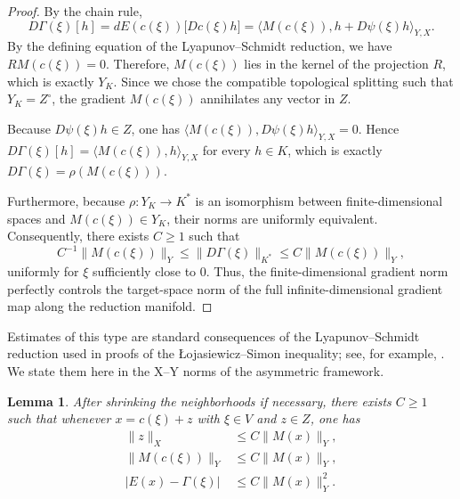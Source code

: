 \documentclass[11pt]{article}
\newtheorem{lemma}[theorem]{Lemma}
\theoremstyle{definition}
\theoremstyle{remark}
\begin{document}
\begin{proof}
By the chain rule,
$$D\Gamma(\xi)[h] = dE(c(\xi)) \bigl[ Dc(\xi)h \bigr] = \langle M(c(\xi)), h + D\psi(\xi)h \rangle_{Y,X}.$$
By the defining equation of the Lyapunov--Schmidt reduction, we have $R M(c(\xi)) = 0$. Therefore, $M(c(\xi))$ lies in the kernel of the projection $R$, which is exactly $Y_K$. Since we chose the compatible topological splitting such that $Y_K = Z^{\circ}$, the gradient $M(c(\xi))$ annihilates any vector in $Z$. 

\smallskip
Because $D\psi(\xi)h\in Z$, one has $\langle M(c(\xi)),D\psi(\xi)h\rangle_{Y,X}=0$. Hence $D\Gamma(\xi)[h]=\langle M(c(\xi)),h\rangle_{Y,X}$ for every $h\in K$, which is exactly $D\Gamma(\xi)=\rho(M(c(\xi)))$.

\smallskip
Furthermore, because $\rho \colon Y_K \to K^*$ is an isomorphism between finite-dimensional spaces and $M(c(\xi)) \in Y_K$, their norms are uniformly equivalent. Consequently, there exists $C \ge 1$ such that
$$C^{-1}\|M(c(\xi))\|_Y \le \|D\Gamma(\xi)\|_{K^*} \le C\|M(c(\xi))\|_Y, $$
uniformly for $\xi$ sufficiently close to $0$. Thus, the finite-dimensional gradient norm perfectly controls the target-space norm of the full infinite-dimensional gradient map along the reduction manifold.
\end{proof}

Estimates of this type are standard consequences of the Lyapunov--Schmidt reduction used in proofs of the \L{}ojasiewicz--Simon inequality; see, for example, \cite{Simon1983,FeehanMaridakis2020}. We state them here in the X--Y norms of the asymmetric framework. 

\begin{lemma} \label{lem:comparison}
After shrinking the neighborhoods if necessary, there exists $C \ge 1$ such that whenever $x=c(\xi)+z$ with $\xi \in V$ and $z \in Z$, one has
\begin{align}
\|z\|_X &\le C\|M(x)\|_Y, \label{eq:z_bound} \\
\|M(c(\xi))\|_Y &\le C\|M(x)\|_Y, \label{eq:M_bound} \\
|E(x)-\Gamma(\xi)| &\le C\|M(x)\|_Y^2. \label{eq:E_bound}
\end{align}
\end{lemma}
\end{document}
